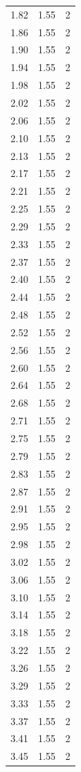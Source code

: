 \begin{longtable}{lrr}
  1.82 & 1.55 & 2 \\
  1.86 & 1.55 & 2 \\
  1.90 & 1.55 & 2 \\
  1.94 & 1.55 & 2 \\
  1.98 & 1.55 & 2 \\
  2.02 & 1.55 & 2 \\
  2.06 & 1.55 & 2 \\
  2.10 & 1.55 & 2 \\
  2.13 & 1.55 & 2 \\
  2.17 & 1.55 & 2 \\
  2.21 & 1.55 & 2 \\
  2.25 & 1.55 & 2 \\
  2.29 & 1.55 & 2 \\
  2.33 & 1.55 & 2 \\
  2.37 & 1.55 & 2 \\
  2.40 & 1.55 & 2 \\
  2.44 & 1.55 & 2 \\
  2.48 & 1.55 & 2 \\
  2.52 & 1.55 & 2 \\
  2.56 & 1.55 & 2 \\
  2.60 & 1.55 & 2 \\
  2.64 & 1.55 & 2 \\
  2.68 & 1.55 & 2 \\
  2.71 & 1.55 & 2 \\
  2.75 & 1.55 & 2 \\
  2.79 & 1.55 & 2 \\
  2.83 & 1.55 & 2 \\
  2.87 & 1.55 & 2 \\
  2.91 & 1.55 & 2 \\
  2.95 & 1.55 & 2 \\
  2.98 & 1.55 & 2 \\
  3.02 & 1.55 & 2 \\
  3.06 & 1.55 & 2 \\
  3.10 & 1.55 & 2 \\
  3.14 & 1.55 & 2 \\
  3.18 & 1.55 & 2 \\
  3.22 & 1.55 & 2 \\
  3.26 & 1.55 & 2 \\
  3.29 & 1.55 & 2 \\
  3.33 & 1.55 & 2 \\
  3.37 & 1.55 & 2 \\
  3.41 & 1.55 & 2 \\
  3.45 & 1.55 & 2 \\

\end{longtable}
